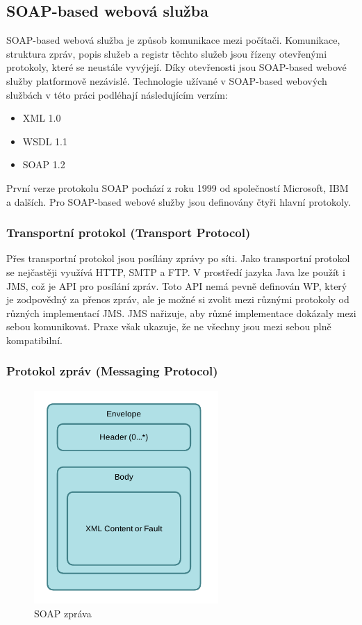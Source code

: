 \documentclass[11pt,twoside,a4paper]{book}
\begin{document}
\subsection{SOAP-based webová služba}

SOAP-based webová služba \cite{Kalin13} je způsob komunikace mezi počítači.
Komunikace, struktura zpráv, popis služeb a registr těchto služeb jsou řízeny otevřenými protokoly, které se
neustále vyvýjejí. Díky otevřenosti jsou SOAP-based webové služby platformově
nezávislé. Technologie užívané v SOAP-based webových službách v této práci
podléhají následujícím verzím:

\begin{itemize}
 \item XML 1.0
  \item WSDL 1.1
  \item SOAP 1.2
\end{itemize}

První verze protokolu SOAP pochází z roku 1999 od společností Microsoft, IBM a
dalších. Pro SOAP-based webové služby jsou definovány čtyři hlavní protokoly.

\subsubsection{Transportní protokol (Transport Protocol)}

Přes transportní protokol jsou posílány zprávy po síti. Jako transportní
protokol se nejčastěji využívá HTTP, SMTP a FTP. V prostředí jazyka Java lze
použít i JMS, což je API pro posílání zpráv. Toto API nemá pevně definován WP,
který je zodpovědný za přenos zpráv, ale je možné si zvolit mezi různými
protokoly od různých implementací JMS. JMS nařizuje, aby různé implementace
dokázaly mezi sebou komunikovat. Praxe však ukazuje, že ne všechny jsou mezi
sebou plně kompatibilní.

\subsubsection{Protokol zpráv (Messaging Protocol)}

\begin{figure}[h]
\begin{center}
\includegraphics[width=7cm]{images-pdf/soap.pdf} 
\caption{SOAP zpráva}
\label{fig:soap-zprava}
\end{center}
\end{figure}
\end{document}
